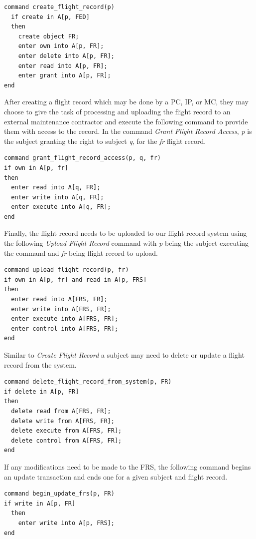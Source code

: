 \documentclass[10pt,journal,compsoc]{IEEEtran}
\begin{document}
\begin{lstlisting}
command create_flight_record(p)
  if create in A[p, FED]
  then
    create object FR;
    enter own into A[p, FR];
    enter delete into A[p, FR];
    enter read into A[p, FR];
    enter grant into A[p, FR];
end
\end{lstlisting}

After creating a flight record which may be done by a PC, IP, or MC, they may choose to give the task of processing and uploading the flight record to an external maintenance contractor and execute the following command to provide them with access to the record. 
In the command \textit{Grant Flight Record Access}, \textit{p} is the subject granting the right to subject \textit{q}, for the \textit{fr} flight record.

\begin{lstlisting}
command grant_flight_record_access(p, q, fr)
if own in A[p, fr]
then
  enter read into A[q, FR];
  enter write into A[q, FR];
  enter execute into A[q, FR];
end
\end{lstlisting}  

Finally, the flight record needs to be uploaded to our flight record system using the following \textit{Upload Flight Record} command with \textit{p} being the subject executing the command and \textit{fr} being flight record to upload.

\begin{lstlisting}
command upload_flight_record(p, fr)
if own in A[p, fr] and read in A[p, FRS]
then
  enter read into A[FRS, FR];
  enter write into A[FRS, FR];
  enter execute into A[FRS, FR];
  enter control into A[FRS, FR];
end
\end{lstlisting}

Similar to \textit{Create Flight Record} a subject may need to delete or update a flight record from the system. 

\begin{lstlisting}
command delete_flight_record_from_system(p, FR)
if delete in A[p, FR]
then
  delete read from A[FRS, FR];
  delete write from A[FRS, FR];
  delete execute from A[FRS, FR];
  delete control from A[FRS, FR];
end
\end{lstlisting}

If any modifications need to be made to the FRS, the following command begins an update transaction and ends one for a given subject and flight record. 

\begin{lstlisting}
command begin_update_frs(p, FR)
if write in A[p, FR]
  then
    enter write into A[p, FRS];
end
\end{lstlisting}
\end{document}

